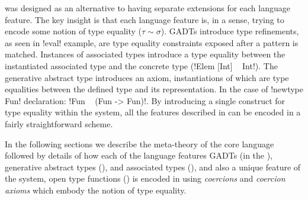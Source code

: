 \documentclass[screen,nonacm]{acmart}
\begin{document}
\SFC\cite{sulzmann_system_2007}
was designed as an alternative to having separate extensions for
each language feature. The key insight is that each language feature
is, in a sense, trying to encode some notion of type equality
($\tau\sim\sigma$). GADTs introduce type refinements, as seen in
!eval! example, are type equality constraints exposed after a pattern
is matched. Instances of associated types introduce a type equality
between the instantiated associated type and the concrete type
(!Elem [Int] ~ Int!). The generative abstract type introduces an axiom,
instantiations of which are type equalities between the defined type
and its representation. In the case of !newtype Fun! declaration:
!Fun ~ (Fun -> Fun)!. By introducing a single construct for type equality
within the system, all the features described in
 can be encoded in a fairly
straightforward scheme.

In the following sections we describe the meta-theory of the core
language followed by details of how each of the language features
GADTs (in the ), generative abstract
types (), and associated
types (), and also a unique feature of
the system, open type functions () is
encoded in \SFC using \emph{coercions} and \emph{coercion
  axioms} which embody the notion of type equality.








\end{document}
